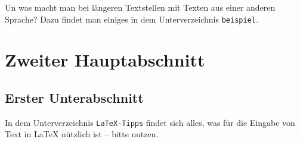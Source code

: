 \begin{refsection}
Un was macht man bei längeren Textstellen mit Texten aus einer anderen Sprache?
Dazu findet man einiges in dem Unterverzeichnis \texttt{beispiel}.


\section*{Zweiter Hauptabschnitt}		  
\subsection*{Erster Unterabschnitt}	
	  
In dem Unterverzeichnis \texttt{LaTeX-Tipps} findet sich alles, was für die Eingabe von Text in \LaTeX{} nützlich ist -- bitte nutzen.


\RaggedRight
\printbibliography
\end{refsection}

